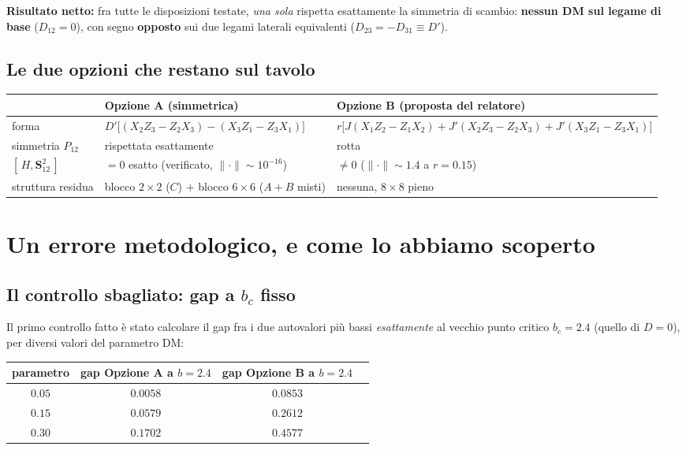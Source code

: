 \documentclass[11pt,a4paper]{article}
\theoremstyle{remark}
\begin{document}
\textbf{Risultato netto:} fra tutte le disposizioni testate, \emph{una sola} rispetta
esattamente la simmetria di scambio: \textbf{nessun DM sul legame di base}
($D_{12}=0$), con segno \textbf{opposto} sui due legami laterali equivalenti
($D_{23}=-D_{31}\equiv D'$).

\subsection{Le due opzioni che restano sul tavolo}

\begin{center}
\renewcommand{\arraystretch}{1.4}
\begin{tabular}{@{}p{2.3cm}p{6.3cm}p{6.3cm}@{}}
\toprule
& \textbf{Opzione A} (simmetrica) & \textbf{Opzione B} (proposta del relatore) \\
\midrule
forma & $D'\big[(X_2Z_3{-}Z_2X_3)-(X_3Z_1{-}Z_3X_1)\big]$ &
$r\big[J(X_1Z_2{-}Z_1X_2)+J'(X_2Z_3{-}Z_2X_3)+J'(X_3Z_1{-}Z_3X_1)\big]$ \\
simmetria $P_{12}$ & rispettata esattamente & rotta \\
$[\,H,\mathbf S_{12}^2\,]$ & $=0$ esatto (verificato, $\|\cdot\|\sim10^{-16}$) & $\neq0$
($\|\cdot\|\sim1.4$ a $r{=}0.15$) \\
struttura residua & blocco $2{\times}2$ ($C$) $+$ blocco $6{\times}6$ ($A{+}B$ misti) &
nessuna, $8\times8$ pieno \\
\bottomrule
\end{tabular}
\end{center}

\section{Un errore metodologico, e come lo abbiamo scoperto}

\subsection{Il controllo sbagliato: gap a $b_c$ fisso}

Il primo controllo fatto è stato calcolare il gap fra i due autovalori più bassi
\emph{esattamente} al vecchio punto critico $b_c=2.4$ (quello di $D=0$), per diversi
valori del parametro DM:

\begin{center}
\renewcommand{\arraystretch}{1.3}
\begin{tabular}{cccc}
\toprule
parametro & gap Opzione A a $b{=}2.4$ & gap Opzione B a $b{=}2.4$ \\
\midrule
$0.05$ & $0.0058$ & $0.0853$ \\
$0.15$ & $0.0579$ & $0.2612$ \\
$0.30$ & $0.1702$ & $0.4577$ \\
\bottomrule
\end{tabular}
\end{center}
\end{document}
